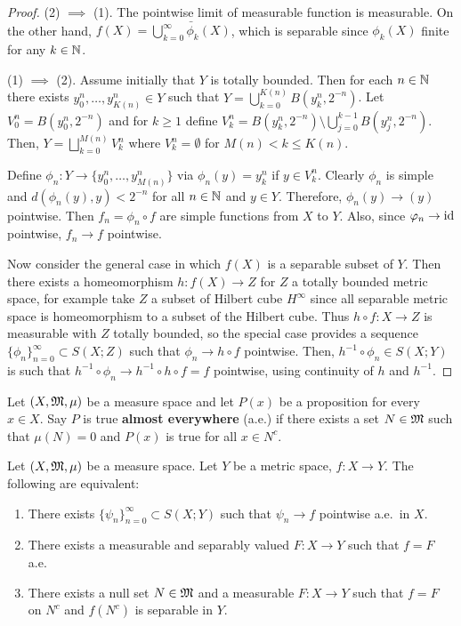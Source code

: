 \documentclass[a4paper]{article}
\renewcommand{\seqinfn}[1]{\{ #1 \}_{n=0}^\infty}
\renewcommand{\cupinfk}{\bigcup_{k=0}^\infty}
\begin{document}
\begin{proof}

  (2) $\implies$ (1). The pointwise limit of measurable function
  is measurable. On the other hand, $f(X) = \bar{\cupinfk \phi_k(X)}$,
  which is separable since $\phi_k(X)$ finite for any $k \in \mathbb{N}$.

  (1) $\implies$ (2). Assume initially that $Y$ is totally bounded.
  Then for each $n \in \mathbb{N}$ there exists $y^n_0, \dots, y^n_{K(n)} \in Y$
  such that $Y = \bigcup_{k=0}^{K(n)} B(y^n_k, 2^{-n})$.
  Let $V^n_0 = B(y_0^n, 2^{-n})$ and for $k \geq 1$ define
  $V^n_k = B(y^n_k, 2^{-n}) \setminus \bigcup_{j=0}^{k-1}
    B(y^n_j, 2^{-n})$. Then, $Y = \bigsqcup_{k=0}^{M(n)} V_k^n$
  where $V^n_k = \emptyset$ for $M(n) < k \leq K(n)$.

  Define $\phi_n: Y \to \{ y_0^n, \dots, y_{M(n)}^n \}$ via $\phi_n(y) =
  y_k^n$ if $y \in V_k^n$. Clearly $\phi_n$ is simple and $d(\phi_n(y), y)
  < 2^{-n}$ for all $n \in \mathbb{N}$ and $y \in Y$. Therefore, $\phi_n(y) \to
  (y)$ pointwise. Then $f_n = \phi_n \circ f$ are simple functions from
  $X$ to $Y$. Also, since $\varphi_n \to \operatorname{id}$ pointwise, $f_n \to f$
  pointwise.

  Now consider the general case in which $f(X)$ is a separable subset of
  $Y$. Then there exists a homeomorphism $h: f(X) \to Z$ for $Z$ a totally
  bounded metric space, for example take $Z$ a subset of Hilbert cube
  $H^\infty$ since all separable metric space is homeomorphism to a subset
  of the Hilbert cube. Thus $h \circ f: X \to Z$ is measurable with $Z$
  totally bounded, so the special case provides a sequence
  $\seqinfn{\phi_n} \subset S(X; Z)$ such that $\phi_n \to h \circ f$
  pointwise. Then, $h^{-1} \circ \phi_n \in S(X; Y)$ is such that $h^{-1}
  \circ \phi_n \to h^{-1} \circ h \circ f = f$ pointwise, using continuity
  of $h$ and $h^{-1}$.

\end{proof}

\begin{defi}

  Let $(X, \mathfrak{M}, \mu)$ be a measure space and let $P(x)$ be a proposition
  for every $x \in X$. Say $P$ is true \textbf{almost everywhere} (a.e.)
  if there exists a set $N \in \mathfrak{M}$ such that $\mu(N) = 0$ and $P(x)$ is
  true for all $x \in N^c$.

\end{defi}

\begin{thm}
  Let $(X, \mathfrak{M}, \mu)$ be a measure space. Let $Y$ be a metric space, $f: X
    \to Y$. The following are equivalent:
  \begin{enumerate}
    \item There exists $\seqinfn{\psi_n} \subset S(X; Y)$ such that
          $\psi_n \to f$ pointwise a.e.\ in $X$.
    \item There exists a measurable and separably valued $F : X \to Y$
          such that $f = F$ a.e.\
    \item There exists a null set $N \in \mathfrak{M}$ and a measurable $F: X \to
          Y$ such that $f = F$ on $N^c$ and $f(N^c)$ is separable in $Y$.
  \end{enumerate}
\end{thm}
\end{document}
